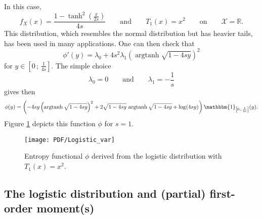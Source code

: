 \documentclass[english,onecolumn]{elsarticle}
\def\Rset{\mathbb{R}}
\def\X{\mathcal{X}}
\def\un{\mathbbm{1}}
\def\argtanh{\operatorname{argtanh}}
\begin{document}
In this case,
%
\[
f_X(x) = \frac{1 - \tanh^2 \! \left( \frac{x}{2 s} \right)}{4 s} \qquad
\mbox{and} \qquad T_1(x) = x^2  \qquad \mbox{on} \qquad \X = \Rset.
\]
%
%
This  distribution, which  resembles  the normal  distribution  but has  heavier
tails, has been used in many applications. One can then check that
%
\[
\phi'(y) = \lambda_0 + 4 s^2 \lambda_1  \left( \argtanh \sqrt{1 - 4 s y} \right)^2
\]
%
for $y \in \left[ 0 \, ; \,  \frac{1}{4s} \right]$. The simple choice
%
\[
\lambda_0 = 0 \qquad \mbox{and} \qquad \lambda_1 = - \frac{1}{s}
\]
%
gives then
%
\[
\phi(y) = \left( - 4 s y \left( \argtanh \sqrt{1-4 s y} \right)^2 + 2
\sqrt{1-4sy} \, \argtanh \sqrt{1-4 s y} + \log (4 s y) \right) \un_{\left[ 0 \,
; \, \frac{1}{4 s} \right]}(y).
\]
%
Figure \ref{fig:Entropy-logistic-var} depicts this function $\phi$ for $s = 1$.
%
\begin{figure}[htbp]
\centerline{\texttt{[image: PDF/Logistic\_var]}}
\caption{Entropy functional  $\phi$ derived from the  logistic distribution with
  $T_1(x) = x^2$.}
\label{fig:Entropy-logistic-var}
\end{figure}



\subsection{The logistic distribution and (partial) first-order moment(s)}
\label{subsec:LogisticFirstOrder}
\end{document}
